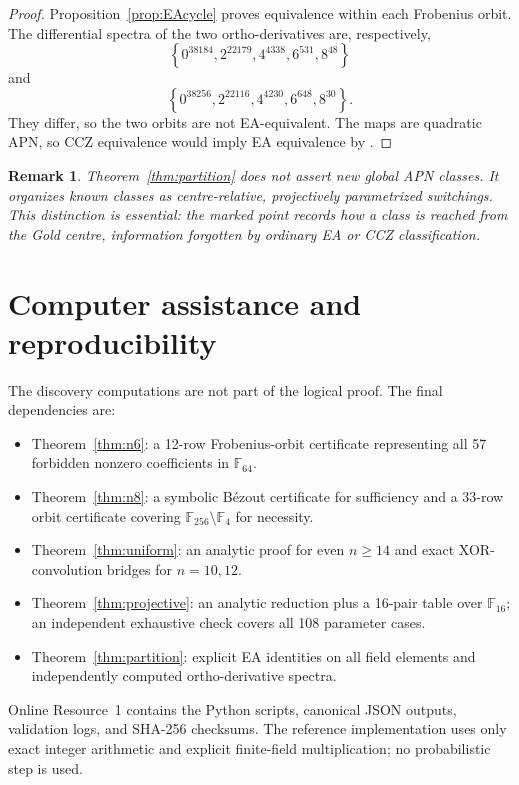 \documentclass[pdflatex,sn-mathphys-num]{sn-jnl}
\theoremstyle{thmstyleone}
\theoremstyle{thmstyletwo}
\newtheorem{remark}[theorem]{Remark}
\theoremstyle{thmstylethree}
\newcommand{\F}{\mathbb F}
\newcommand{\set}[1]{\left\{#1\right\}}
\begin{document}
\begin{proof}
Proposition~\ref{prop:EAcycle} proves equivalence within each Frobenius orbit.  The differential spectra of the two ortho-derivatives are, respectively,
\[
 \set{0^{38184},2^{22179},4^{4338},6^{531},8^{48}}
\]
and
\[
 \set{0^{38256},2^{22116},4^{4230},6^{648},8^{30}}.
\]
They differ, so the two orbits are not EA-equivalent.  The maps are quadratic APN, so CCZ equivalence would imply EA equivalence by \cite{Yoshiara2012}.
\end{proof}

\begin{remark}
Theorem~\ref{thm:partition} does not assert new global APN classes.  It organizes known classes as centre-relative, projectively parametrized switchings.  This distinction is essential: the marked point records how a class is reached from the Gold centre, information forgotten by ordinary EA or CCZ classification.
\end{remark}

\section{Computer assistance and reproducibility}\label{sec:repro}

The discovery computations are not part of the logical proof.  The final dependencies are:
\begin{itemize}
\item Theorem~\ref{thm:n6}: a 12-row Frobenius-orbit certificate representing all 57 forbidden nonzero coefficients in $\F_{64}$.
\item Theorem~\ref{thm:n8}: a symbolic B\'ezout certificate for sufficiency and a 33-row orbit certificate covering $\F_{256}\setminus\F_4$ for necessity.
\item Theorem~\ref{thm:uniform}: an analytic proof for even $n\ge14$ and exact XOR-convolution bridges for $n=10,12$.
\item Theorem~\ref{thm:projective}: an analytic reduction plus a 16-pair table over $\F_{16}$; an independent exhaustive check covers all 108 parameter cases.
\item Theorem~\ref{thm:partition}: explicit EA identities on all field elements and independently computed ortho-derivative spectra.
\end{itemize}

Online Resource~1 contains the Python scripts, canonical JSON outputs, validation logs, and SHA-256 checksums.  The reference implementation uses only exact integer arithmetic and explicit finite-field multiplication; no probabilistic step is used.
\end{document}
